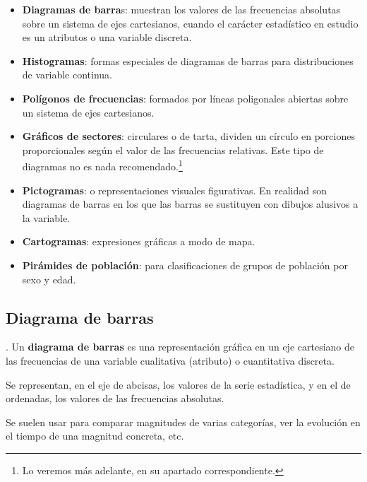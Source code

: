 \begin{itemize}
	\item \textbf{Diagramas de barra}s: muestran los valores de las frecuencias absolutas sobre un sistema de ejes cartesianos, cuando el carácter estadístico en estudio es un atributos o  una variable discreta.
	\item \textbf{Histogramas}: formas especiales de diagramas de barras para distribuciones de variable continua.
	\item \textbf{Polígonos de frecuencias}: formados por líneas poligonales abiertas sobre un sistema de ejes cartesianos.
	\item \textbf{Gráficos de sectores}: circulares o de tarta, dividen un círculo en porciones proporcionales según el valor de las frecuencias relativas. \textcolor{gris}{Este tipo de diagramas no es nada recomendado.\footnote{Lo veremos más adelante, en su apartado correspondiente.}}
	\item \textbf{Pictogramas}: o representaciones visuales figurativas. En realidad son diagramas de barras en los que las barras se sustituyen con dibujos alusivos a la variable. 
	\item \textbf{Cartogramas}: expresiones gráficas a modo de mapa.
	\item \textbf{Pirámides de población}: para clasificaciones de grupos de población por sexo y edad.
\end{itemize}

\subsection{Diagrama de barras}

\begin{definition}
	. Un \textbf{diagrama de barras} es una representación gráfica en un eje cartesiano de las frecuencias de una variable cualitativa (atributo) o cuantitativa discreta.
		
	\vspace{2mm} Se representan, en el eje de abcisas, los valores de la serie estadística, y en el de ordenadas, los valores de las frecuencias absolutas.
	
	\vspace{2mm} Se suelen usar para comparar magnitudes de varias categorías, ver la evolución en el tiempo de una magnitud concreta, etc.
\end{definition}

